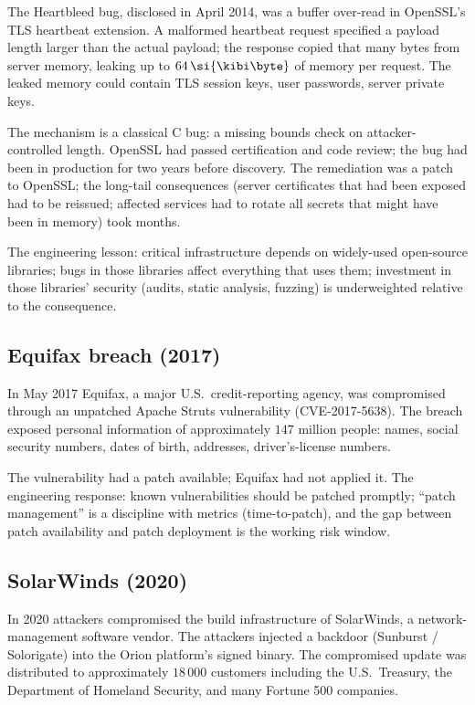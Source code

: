 The Heartbleed bug, disclosed in April 2014, was a buffer over-read in OpenSSL's TLS heartbeat extension. A malformed heartbeat request specified a payload length larger than the actual payload; the response copied that many bytes from server memory, leaking up to $64\,\si{\kibi\byte}$ of memory per request. The leaked memory could contain TLS session keys, user passwords, server private keys.

The mechanism is a classical C bug: a missing bounds check on attacker-controlled length. OpenSSL had passed certification and code review; the bug had been in production for two years before discovery. The remediation was a patch to OpenSSL; the long-tail consequences (server certificates that had been exposed had to be reissued; affected services had to rotate all secrets that might have been in memory) took months.

The engineering lesson: critical infrastructure depends on widely-used open-source libraries; bugs in those libraries affect everything that uses them; investment in those libraries' security (audits, static analysis, fuzzing) is underweighted relative to the consequence.

\subsection{Equifax breach (2017)}

In May 2017 Equifax, a major U.S.\ credit-reporting agency, was compromised through an unpatched Apache Struts vulnerability (CVE-2017-5638). The breach exposed personal information of approximately $147$ million people: names, social security numbers, dates of birth, addresses, driver's-license numbers.

The vulnerability had a patch available; Equifax had not applied it. The engineering response: known vulnerabilities should be patched promptly; ``patch management'' is a discipline with metrics (time-to-patch), and the gap between patch availability and patch deployment is the working risk window.

\subsection{SolarWinds (2020)}

In 2020 attackers compromised the build infrastructure of SolarWinds, a network-management software vendor. The attackers injected a backdoor (Sunburst / Solorigate) into the Orion platform's signed binary. The compromised update was distributed to approximately $18\,000$ customers including the U.S.\ Treasury, the Department of Homeland Security, and many Fortune 500 companies.

